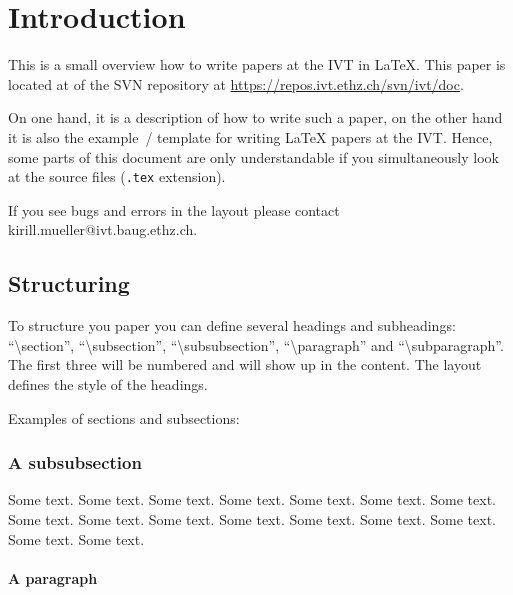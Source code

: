 %
\section{Introduction}
%

This is a small overview how to write papers at the IVT in \LaTeX.
This paper is located at  
of the SVN repository at \url{https://repos.ivt.ethz.ch/svn/ivt/doc}.

On one hand, it is a
description of how to write such a paper, on the other hand it is also
the example~/ template for writing \LaTeX{} papers at the IVT.
Hence, some parts of this document are only understandable if you
simultaneously look at the source files (\texttt{.tex} extension).

If you see bugs and errors in the layout please contact
kirill.mueller@ivt.baug.ethz.ch.

\subsection{Structuring}

To structure you paper you can define several headings and
subheadings:
``\textbackslash{}section'', ``\textbackslash{}subsection'',
``\textbackslash{}subsubsection'', ``\textbackslash{}paragraph'' and
``\textbackslash{}subparagraph''. The first three will be numbered and
will show
up in the content. The layout defines the style of the headings.

Examples of sections and subsections:

\subsubsection{A subsubsection}

Some text. Some text. Some text. Some text. Some text. Some text. Some
text. Some text. Some text. Some text. Some text. Some text. Some
text. Some text. Some text. Some text.

\paragraph{A paragraph}

